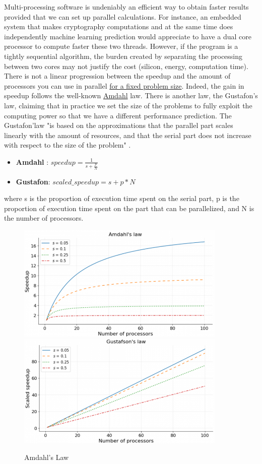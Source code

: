 \documentclass[10pt,letterpaper]{article}
\begin{document}
Multi-processing software is undeniably an efficient way to obtain faster results provided that we can set up parallel calculations. For instance, an embedded system that makes cryptography computations and at the same time does independently machine learning prediction would appreciate to have a dual core processor to compute faster these two threads. However, if the program is a tightly sequential algorithm, the burden created by separating the processing between two cores may not justify the cost (silicon, energy, computation time). There is not a linear progression between the speedup and the amount of processors you can use in parallel \underline{for a fixed problem size}. Indeed, the gain in speedup follows the well-known \underline{Amdahl} law. There is another law, the Gustafon's law, claiming that in practice we set the size of the problems to fully exploit the computing power so that we have a different performance prediction. The Gustafon'law "is based on the approximations that the parallel part scales linearly with the amount of resources, and that the serial part does not increase with respect to the size of the problem" \cite{url1}.

\begin{itemize}
    \item \textbf{Amdahl} : $speedup = \frac{1}{s+\frac{p}{N}}$
    \item \textbf{Gustafon}: $scaled\_speedup = s + p * N$
\end{itemize}

where s is the proportion of execution time spent on the serial part, p is the proportion of execution time spent on the part that can be parallelized, and N is the number of processors.

\begin{figure}[H]
\centering
\includegraphics[width=10cm]{img/multi_proc/Amdahl_laws.png}
\includegraphics[width=10cm]{img/multi_proc/gustafon_laws.PNG}
\caption{Amdahl's Law}
\label{fig:amdahl}
\end{figure}
\end{document}
